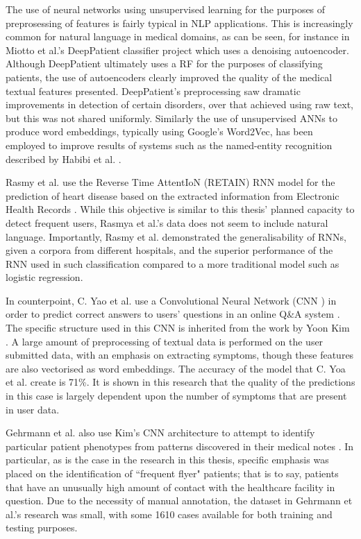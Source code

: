 The use of neural networks using unsupervised learning for the purposes of preprosessing of features is fairly typical in NLP applications. This is increasingly common for natural language in medical domains, as can be seen, for instance in Miotto et al.'s DeepPatient classifier project which uses a denoising autoencoder\cite{miotto2016deep}. Although DeepPatient ultimately uses a RF for the purposes of classifying patients,  the use of autoencoders clearly improved the quality of the medical textual features presented. DeepPatient's preprocessing saw dramatic improvements in detection of certain disorders, over that achieved using raw text, but this was not shared uniformly. Similarly the use of unsupervised ANNs to produce word embeddings, typically using Google's Word2Vec, has been employed to improve results of systems such as the named-entity recognition described by Habibi et al. \cite{habibi2017deep}. 

Rasmy et al. use the Reverse Time AttentIoN  (RETAIN) RNN model for the prediction of heart disease based on the extracted information from Electronic Health Records \cite{rasmy2018study}. While this objective is similar to this thesis' planned capacity to detect frequent users, Rasmya et al.'s data does not seem to include natural language. Importantly, Rasmy et al. demonstrated the generalisability of RNNs, given a corpora from different hospitals, and the superior performance of the RNN used in such classification compared to a more traditional model such as logistic regression.

In counterpoint, C. Yao et al. use a Convolutional Neural Network (CNN ) in order to predict correct answers to users' questions in an online Q\&A system \cite{yao2016convolutional}. The specific structure used in this CNN  is inherited from the work by Yoon Kim 
\cite{kim2014convolutional}. A large amount of preprocessing of textual data is performed on the user submitted data, with an emphasis on extracting symptoms, though these features are also vectorised as word embeddings. The accuracy of the model that C. Yoa et al. create is 71\%. It is shown in this research that the quality of the predictions in this case is largely dependent upon the number of symptoms that are present in user data. 

Gehrmann et al. also use Kim's CNN architecture to attempt to identify particular patient phenotypes from patterns discovered in their medical notes \cite{gehrmann2018comparing}. In particular, as is the case in the research in this thesis, specific emphasis was placed on the identification of ``frequent flyer" patients; that is to say, patients that have an unusually high amount of contact with the healthcare facility in question. Due to the necessity of manual annotation, the dataset in Gehrmann et al.'s research was small, with some 1610 cases available for both training and testing purposes.    

